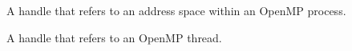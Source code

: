 {
\glossarydefstart
A handle that refers to an address space within an OpenMP process.
\glossarydefend

\glossarydefstart
A handle that refers to an OpenMP thread. 
\glossarydefend

}
